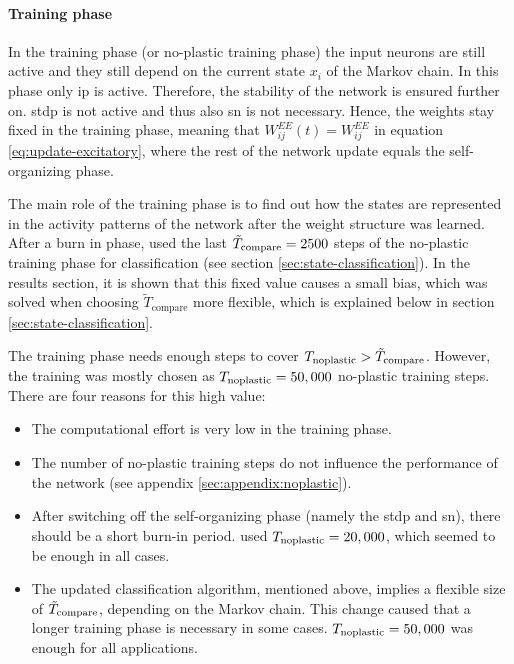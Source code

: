 \paragraph{Training phase}

In the training phase (or no-plastic training phase) the input neurons are still active and they still depend on the current state $x_i$ of the Markov chain. In this phase only \ac{ip} is active. Therefore, the stability of the network is ensured further on. \ac{stdp} is not active and thus also \ac{sn} is not necessary. Hence, the weights stay fixed in the training phase, meaning that $W^{EE}_{ij}(t) = W^{EE}_{ij}$ in equation \eqref{eq:update-excitatory}, where the rest of the network update equals the self-organizing phase.

The main role of the training phase is to find out how the states are represented in the activity patterns of the network after the weight structure was learned. After a burn in phase, \textcite{hartmann2015s} used the last $\tilde{T}_{\text{compare}} = 2500$ steps of the no-plastic training phase for classification (see section \ref{sec:state-classification}). In the results section, it is shown that this fixed value causes a small bias, which was solved when choosing $\tilde{T}_{\text{compare}}$ more flexible, which is explained below in section \ref{sec:state-classification}.

The training phase needs enough steps to cover $T_{\text{noplastic}} > \tilde{T}_{\text{compare}}$. However, the training was mostly chosen as $T_{\text{noplastic}} = 50,000$ no-plastic training steps. There are four reasons for this high value:

\begin{itemize}
\item The computational effort is very low in the training phase.
\item The number of no-plastic training steps do not influence the performance of the network (see appendix \ref{sec:appendix:noplastic}).
\item After switching off the self-organizing phase (namely the \ac{stdp} and \ac{sn}), there should be a short burn-in period. \textcite{hartmann2015s} used $T_{\text{noplastic}} = 20,000$, which seemed to be enough in all cases.
\item The updated classification algorithm, mentioned above, implies a flexible size of $\tilde{T}_{\text{compare}}$, depending on the Markov chain. This change caused that a longer training phase is necessary in some cases. $T_{\text{noplastic}} = 50,000$ was enough for all applications.
\end{itemize}

